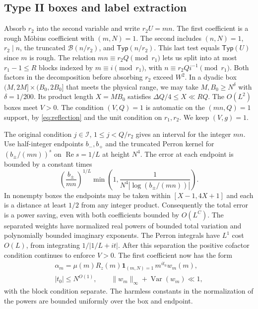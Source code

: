 \documentclass[11pt]{amsart}
\numberwithin{equation}{section}
\theoremstyle{remark}
\newcommand{\one}{\mathbf 1}
\newcommand{\Typ}{\mathsf{Typ}}
\newcommand{\Var}{\operatorname{Var}}
\begin{document}
\subsection{Type II boxes and label extraction}\label{sec:type-II}

Absorb $r_2$ into the second variable and write $r_2U=mn$. The first coefficient is a rough M\"obius coefficient with $(m,N)=1$. The second includes $(n,N)=1$, $r_2\mid n$, the truncated $\mathcal B(n/r_2)$, and $\Typ(n/r_2)$. This last test equals $\Typ(U)$ since $m$ is rough. The relation $mn\equiv r_2Q\pmod{r_1}$ lets us split into at most $r_1-1\le R$ blocks indexed by $m\equiv i\pmod{r_1}$, with $n\equiv r_2Qi^{-1}\pmod{r_1}$. Both factors in the decomposition before absorbing $r_2$ exceed $W^2$. In a dyadic box $(M,2M]\times(B_0,2B_0]$ that meets the physical range, we may take $M,B_0\ge N^\delta$ with $\delta=1/200$. Its product length $X=MB_0$ satisfies $\Delta Q/4\le X\ll RQ$. The $O(L^2)$ boxes meet $V>0$. The condition $(V,Q)=1$ is automatic on the $(mn,Q)=1$ support, by \eqref{eq:reflection} and the unit condition on $r_1,r_2$. We keep $(V,g)=1$.

The original condition $j\in\mathcal I$, $1\le j<Q/r_2$ gives an interval for the integer $mn$. Use half-integer endpoints $b_-,b_+$ and the truncated Perron kernel for $(b_\pm/(mn))^s$ on $\operatorname{Re}s=1/L$ at height $N^4$. The error at each endpoint is bounded by a constant times
\[
 \left(\frac{b_\pm}{mn}\right)^{1/L}
 \min\left(1,\frac{1}{N^4|\log(b_\pm/(mn))|}\right).
\]
In nonempty boxes the endpoints may be taken within $[X-1,4X+1]$ and each is a distance at least $1/2$ from any integer product. Consequently the total error is a power saving, even with both coefficients bounded by $O(L^C)$. The separated weights have normalized real powers of bounded total variation and polynomially bounded imaginary exponents. The Perron integrals have $L^1$ cost $O(L)$, from integrating $1/|1/L+it|$. After this separation the positive cofactor condition continues to enforce $V>0$. The first coefficient now has the form
\begin{equation}\label{eq:first-coefficient}
 \begin{gathered}
 \alpha_m=\mu(m)R_z(m)\one_{(m,N)=1}\,m^{it_0}w_m(m),\\
 |t_0|\le N^{O(1)},\qquad
 \|w_m\|_\infty+\Var(w_m)\ll1,
 \end{gathered}
\end{equation}
with the block condition separate. The harmless constants in the normalization of the powers are bounded uniformly over the box and endpoint.
\end{document}
